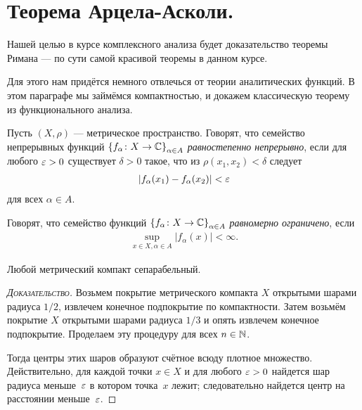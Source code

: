 \documentclass[../complex-analysis.tex]{subfiles}
\begin{document}
\newpage
\section{Теорема Арцела-Асколи.}

Нашей целью в курсе комплексного анализа будет доказательство теоремы Римана --- по сути самой красивой теоремы в данном курсе.

Для этого нам придётся немного отвлечься от теории аналитических функций. В этом параграфе мы займёмся компактностью, и докажем классическую теорему из функционального анализа.

\begin{df}
 Пусть $ (X,\rho) $ --- метрическое пространство. Говорят, что семейство непрерывных функций $ \left\{f_\alpha\colon X \to \mathbb{C}\right\}_{\alpha \in A}  $ \emph{равностепенно непрерывно}, если для любого $ \varepsilon > 0 $ существует $ \delta > 0 $ такое, что из $ \rho(x_1, x_2) < \delta $ следует
 \begin{align}
  \left|f_\alpha(x_1) - f_\alpha(x_2) \right| < \varepsilon \label{eq:equicontinuity}
 \end{align} для всех $ \alpha \in A $.
\end{df}
\begin{df}
 Говорят, что семейство функций $ \left\{f_\alpha\colon X \to \mathbb{C} \right\}_{\alpha \in A}  $ \textit{равномерно ограничено}, если
 \begin{align*}
  \sup_{x \in X, \alpha \in A} \left| f_\alpha(x) \right| < \infty.
 \end{align*}
\end{df}

\begin{lm}
 \label{lemma:metric_compact_is_seperable_space}
 Любой метрический компакт сепарабельный.
\end{lm}
\begin{proof}[\normalfont\textsc{Доказательство}]
 Возьмем покрытие метрического компакта $X$ открытыми шарами радиуса $1/2$, извлечем конечное подпокрытие по компактности. Затем возьмём покрытие $X$ открытыми шарами радиуса $1/3$ и опять извлечем конечное подпокрытие. Проделаем эту процедуру для всех $ n \in \mathbb{N} $.

 Тогда центры этих шаров образуют счётное всюду плотное множество. Действительно, для каждой точки $ x \in X $ и для любого $\varepsilon > 0$ найдется шар радиуса меньше~$ \varepsilon$ в котором точка~$ x $ лежит; следовательно найдется центр на расстоянии меньше~$\varepsilon$. 
\end{proof}
\end{document}
